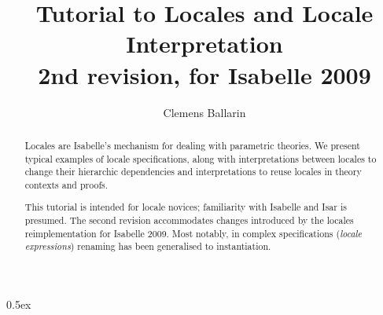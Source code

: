 \documentclass[11pt,a4paper]{article}
\begin{document}
\title{Tutorial to Locales and Locale Interpretation \\[1ex]
  \large 2nd revision, for Isabelle 2009}
\author{Clemens Ballarin}
\date{}

\maketitle

\begin{abstract}
  Locales are Isabelle's mechanism for dealing with parametric theories.
  We present typical examples of locale specifications,
  along with interpretations between locales to change their
  hierarchic dependencies and interpretations to reuse locales in
  theory contexts and proofs.

  This tutorial is intended for locale novices; familiarity with
  Isabelle and Isar is presumed.
  The second revision accommodates changes introduced by the locales
  reimplementation for Isabelle 2009.  Most notably, in complex
  specifications (\emph{locale expressions}) renaming has been
  generalised to instantiation.
\end{abstract}

\parindent 0pt\parskip 0.5ex



\newpage


\end{document}
